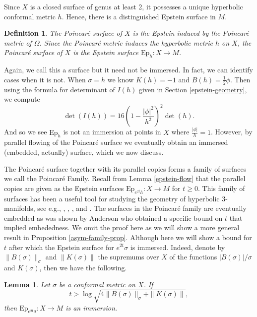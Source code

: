 \documentclass{amsart}
\newtheorem{lem}[thm]{Lemma}
\newtheorem{defn}{Definition}
\begin{document}
Since $X$ is a closed surface of genus at least 2, it possesses a unique hyperbolic conformal metric $h$. 
Hence, there is a distinguished Epstein surface in $M$. 

\begin{defn}
The Poincar\'e surface of $X$ is the Epstein induced by the Poincar\'e metric of $\Omega$. 
Since the Poincar\'e metric induces the hyperbolic metric $h$ on $X$, the Poincar\'e surface of $X$ is the Epstein surface $\mathrm{Ep}_h: X \to M$.
\end{defn}


Again, we call this a surface but it need not be immersed. 
In fact, we can identify cases when it is not. 
When $\sigma = h$ we know $K(h) = -1$ and $B(h) = \frac{1}{2}\phi$. 
Then using the formula for determinant of $I(h)$ given in Section \ref{epstein-geometry}, we compute
\[
\det(I(h)) = 16 \left( 1 - \frac{|\phi|^2}{h^2} \right)^2 \det(h).
\]
And so we see $\mathrm{Ep}_h$ is not an immersion at points in $X$ where $\frac{|\phi|}{h} =1$. 
However, by parallel flowing of the Poincar\'e surface we eventually obtain an immersed (embedded, actually) surface, which we now discuss. 


The Poincar\'e surface together with its parallel copies forms a family of surfaces we call the Poincar\'e Family. 
Recall from Lemma \ref{epstein-flow} that the parallel copies are given as the Epstein surfaces $\mathrm{Ep}_{e^{2t}h}: X \to M$ for $t \geq 0$. 
This family of surfaces has been a useful tool for studying the geometry of hyperbolic 3-manifolds, see e.g., \cite{anderson1998}, \cite{bromberg2004}, \cite{krasnov-schlenker2008}, and \cite{bridgeman-brock-bromberg2019}.
The surfaces in the Poincar\'e family are eventually embedded as was shown by Anderson \cite{anderson1998} who obtained a specific bound on $t$ that implied embededness. 
We omit the proof here as we will show a more general result in Proposition \ref{asym-family-prop}. 
Although here we will show a bound for $t$ after which the Epstein surface for $e^{2t}\sigma$ is immersed. 
Indeed, denote by $\|B(\sigma)\|_\sigma$ and $\|K(\sigma)\|$ the supremums over $X$ of the functions $|B(\sigma)|/\sigma$ and $K(\sigma)$, then we have the following.

\begin{lem}\label{parallel-family-immersed}
Let $\sigma$ be a conformal metric on $X$. 
If 
\[
t > \log  \sqrt{ 4 \|B(\sigma)\|_\sigma + \|K(\sigma)\|},
\]
then $\mathrm{Ep}_{e^{2t}\sigma}: X \to M$ is an immersion.
\end{lem}
\end{document}
